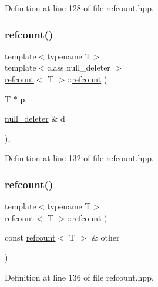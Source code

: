 Definition at line 128 of file refcount.\+hpp.

\mbox{\label{structrefcount_ad40bed4dc6d3ba6609068392c7c7f290}} 
\subsubsection{\texorpdfstring{refcount()}{refcount()}\hspace{0.1cm}{\footnotesize\ttfamily [2/3]}}
{\footnotesize\ttfamily template$<$typename T$>$ \\
template$<$class null\+\_\+deleter $>$ \\
\hyperlink{structrefcount}{refcount}$<$ T $>$\+::\hyperlink{structrefcount}{refcount} (\begin{DoxyParamCaption}\item[{T $\ast$}]{p,  }\item[{\hyperlink{structnull__deleter}{null\+\_\+deleter} \&}]{d }\end{DoxyParamCaption})\hspace{0.3cm}{\ttfamily [inline]}, {\ttfamily [explicit]}}



Definition at line 132 of file refcount.\+hpp.

\mbox{\label{structrefcount_a0102e5e4ea93e25f1964a6cbfca1219b}} 
\subsubsection{\texorpdfstring{refcount()}{refcount()}\hspace{0.1cm}{\footnotesize\ttfamily [3/3]}}
{\footnotesize\ttfamily template$<$typename T$>$ \\
\hyperlink{structrefcount}{refcount}$<$ T $>$\+::\hyperlink{structrefcount}{refcount} (\begin{DoxyParamCaption}\item[{const \hyperlink{structrefcount}{refcount}$<$ T $>$ \&}]{other }\end{DoxyParamCaption})\hspace{0.3cm}{\ttfamily [inline]}}



Definition at line 136 of file refcount.\+hpp.


